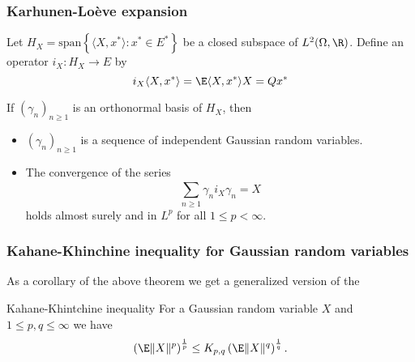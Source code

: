 \begin{frame}
    \frametitle{Karhunen-Lo\`eve expansion}

    Let $H_X = \textrm{span} \left\{ \langle X, x^* \rangle : x^* \in E^* \right\}$ 
    be a closed subspace of $L^2(\Omega, \R)$. Define an operator $i_X : H_X \to E$ by
    \begin{equation*}
        i_X \langle X,x^* \rangle = \E \langle X, x^* \rangle X = Q x^*
    \end{equation*}

    \begin{theorem}
        If $(\gamma_n)_{n \geq 1}$ is an orthonormal basis of $H_X$, then 
        \begin{itemize}
            \item $(\gamma_n)_{n \geq 1}$ is a sequence of independent Gaussian random variables. 
            \item The convergence of the series
                \begin{equation*}
                    \sum_{n \geq 1}^{} \gamma_n i_X \gamma_n = X
                \end{equation*}
                holds almost surely and in $L^p$ for all $1 \leq p < \infty$.
        \end{itemize} 
    \end{theorem}

\end{frame}


\begin{frame}
    \frametitle{Kahane-Khinchine inequality for Gaussian random variables}

    As a corollary of the above theorem we get a generalized version of the
    \begin{block}{Kahane-Khintchine inequality}
        For a Gaussian random variable $X$ and $1 \leq p,q \leq \infty$ we have 
        \begin{equation*}
            \left( \E \| X \|^p \right)^\frac{1}{p} \leq 
            K_{p,q} 
            \left( \E \| X \|^q  \right)^\frac{1}{q}.
        \end{equation*}
    \end{block}

\end{frame}


